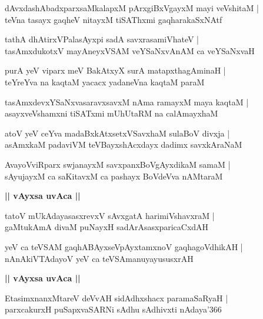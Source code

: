 \documentclass[twoside,12pt,openright]{book}
\newcounter{shloka}[chapter]
\def\uvaca#1{\centerline{{\large\textbf{#1}}}}
\begin{document}
\begin{shloka}%
dAvxdashAbadxparxsaMkalapxM pArxgiBxVgayxM mayi veVshitaM |\\
teVna tasayx gaqheV nitayxM tiSAThxmi gaqharakaSxNAtf
\end{shloka}

\begin{shloka}%
tathA dhAtirxVPalasAyxpi sadA savxrasamiVhateV |\\
tasAmxdukotxV mayAneyxVSAM veYSaNxvAnAM ca veYSaNxvaH 
\end{shloka}

\begin{shloka}%
purA yeV viparx meV BakAtxyX surA matapxthagAminaH |\\
teYreYva na kaqtaM yacacx yadaneVna kaqtaM paraM 
\end{shloka}

\begin{shloka}%
tasAmxdevxYSaNxvasaravxsavxM nAma ramayxM maya kaqtaM |\\
asayxveVshamxni tiSATxmi mUhUtaRM na calAmayxhaM 
\end{shloka}

\begin{shloka}%
atoV yeV ceYva madaBxkAtxsetxVSavxhaM sulaBoV divxja |\\
asAmxkaM padaviVM teVBayxshAcxdayx dadimx savxkAraNaM 
\end{shloka}

\begin{shloka}%
AvayoVviRparx swjanayxM savxpanxBoVgAyxdikaM samaM |\\
sAyujayxM ca saKitavxM ca pashayx BoVdeVva nAMtaraM 
\end{shloka}

\uvaca{|| vAyxsa uvAca ||}

\begin{shloka}%
tatoV mUkAdayasasxrevxV sAvxgatA harimiVshavxraM |\\
gaMtukAmA divaM puNayxH sadArAsasxparicaCxdAH 
\end{shloka}

\begin{shloka}%
yeV ca teVSAM gaqhABAyxseVpAyxtamxnoV gaqhagoVdhikAH |\\
nAnAkiVTAdayoV yeV ca teVSAmanuyayususxrAH 
\end{shloka}

\uvaca{|| vAyxsa uvAca ||}

\begin{shloka}%
EtasimxnanxMtareV deVvAH sidAdhxshacx paramaSaRyaH |\\
parxcakurxH puSapxvaSARNi sAdhu sAdhivxti nAdaya\char'366
\end{shloka}
\end{document}
